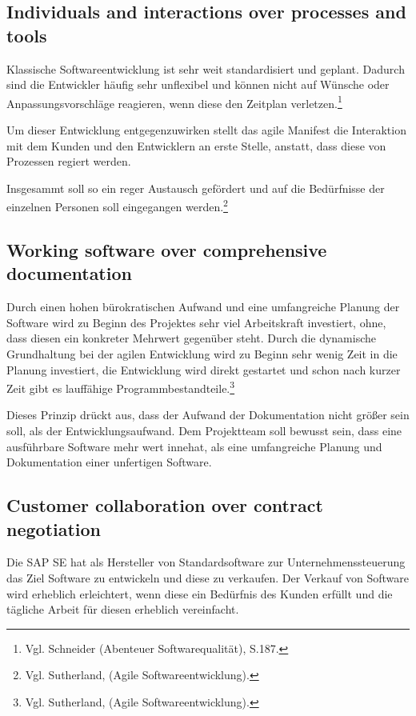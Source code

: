         \subsection{Individuals and interactions over processes and tools}

            Klassische Softwareentwicklung ist sehr weit standardisiert und geplant. Dadurch sind die Entwickler häufig sehr unflexibel und können nicht auf Wünsche oder Anpassungsvorschläge reagieren, wenn diese den Zeitplan verletzen.\footnote{Vgl. Schneider (Abenteuer Softwarequalität), S.187.}

            Um dieser Entwicklung entgegenzuwirken stellt das agile Manifest die Interaktion mit dem Kunden und den Entwicklern an erste Stelle, anstatt, dass diese von Prozessen regiert werden.

            Insgesammt soll so ein reger Austausch gefördert und auf die Bedürfnisse der einzelnen Personen soll eingegangen werden.\footnote{Vgl. Sutherland, (Agile Softwareentwicklung).}

        \subsection{Working software over comprehensive documentation}

            Durch einen hohen bürokratischen Aufwand und eine umfangreiche Planung der Software wird zu Beginn des Projektes sehr viel Arbeitskraft investiert, ohne, dass diesen ein konkreter Mehrwert gegenüber steht. Durch die dynamische Grundhaltung bei der agilen Entwicklung wird zu Beginn sehr wenig Zeit in die Planung investiert, die Entwicklung wird direkt gestartet und schon nach kurzer Zeit gibt es lauffähige Programmbestandteile.\footnote{Vgl. Sutherland, (Agile Softwareentwicklung).}

            Dieses Prinzip drückt aus, dass der Aufwand der Dokumentation nicht größer sein soll, als der Entwicklungsaufwand. Dem Projektteam soll bewusst sein, dass eine ausführbare Software mehr wert innehat, als eine umfangreiche Planung und Dokumentation einer unfertigen Software.

        \subsection{Customer collaboration over contract negotiation}

            Die SAP SE hat als Hersteller von Standardsoftware zur Unternehmenssteuerung das Ziel Software zu entwickeln und diese zu verkaufen. Der Verkauf von Software wird erheblich erleichtert, wenn diese ein Bedürfnis des Kunden erfüllt und die tägliche Arbeit für diesen erheblich vereinfacht.

